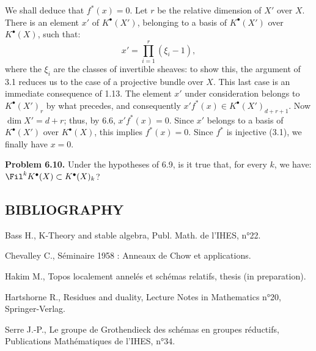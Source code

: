 We shall deduce that $f^*(x)=0$. Let $r$ be the relative dimension of $X'$ over $X$. There is an element $x'$ of $K^{\bullet}(X')$, belonging to a basis of $K^{\bullet}(X')$ over $K^{\bullet}(X)$, such that:
%
\[
  x'=\prod_{i=1}^{r}(\xi_i-1),
\]
where the $\xi_i$ are the classes of invertible sheaves: to show this, the argument of 3.1 reduces us to the case of a projective bundle over $X$. This last case is an immediate consequence of 1.13. The element $x'$ under consideration belongs to $K^{\bullet}(X')_r$ by what precedes, and consequently $x'f^*(x)\in K^{\bullet}(X')_{d+r+1}$. Now $\dim X'=d+r$; thus, by 6.6, $x'f^*(x)=0$. Since $x'$ belongs to a basis of $K^{\bullet}(X')$ over $K^{\bullet}(X)$, this implies $f^*(x)=0$. Since $f^*$ is injective (3.1), we finally have $x=0$.

\textbf{Problem 6.10.} Under the hypotheses of 6.9, is it true that, for every $k$, we have: $\Fil^kK^{\bullet}(X)\subset K^{\bullet}(X)_k$?

\subsection*{BIBLIOGRAPHY}
\begin{enumerate}[label={\textup{[\arabic*]}}]
\item Bass H., K-Theory and stable algebra, Publ. Math. de l'IHES, n°22.
\item Chevalley C., Séminaire 1958 : Anneaux de Chow et applications.
\item Hakim M., Topos localement annelés et schémas relatifs, thesis (in preparation).
\item Hartshorne R., Residues and duality, Lecture Notes in Mathematics n°20, Springer-Verlag.
\item Serre J.-P., Le groupe de Grothendieck des schémas en groupes réductifs, Publications Mathématiques de l'IHES, n°34.
\end{enumerate}

\providecommand{\Kosz}{\mathrm K}
\providecommand{\Proj}{\operatorname{Proj}}
\providecommand{\Sym}{\operatorname{Sym}}
\providecommand{\gr}{\operatorname{gr}}
\providecommand{\Tor}{\operatorname{Tor}}
\providecommand{\Spec}{\operatorname{Spec}}
\providecommand{\Imf}{\operatorname{Im}}
\providecommand{\Ker}{\operatorname{Ker}}
\providecommand{\Id}{\operatorname{Id}}
\providecommand{\rad}{\operatorname{rad}}
\providecommand{\cO}{\mathcal O}
\providecommand{\cS}{\mathcal S}
\providecommand{\cJ}{\mathcal J}
\providecommand{\cN}{\mathcal N}
\providecommand{\bfP}{\mathbf P}
\providecommand{\bfA}{\mathbf A}

